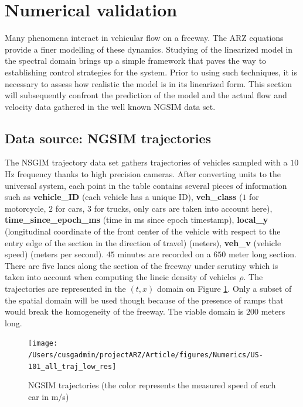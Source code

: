 \documentclass[preprint]{elsarticle}
\begin{document}
\section{Numerical validation}

Many phenomena interact in vehicular flow on a freeway. The ARZ equations
provide a finer modelling of these dynamics. Studying of the linearized
model in the spectral domain brings up a simple framework that paves
the way to establishing control strategies for the system. Prior to
using such techniques, it is necessary to assess how realistic the
model is in its linearized form. This section will subsequently confront the prediction of the model and the actual flow
and velocity data gathered in the well known NGSIM data set.


\subsection{Data source: NGSIM trajectories}

The NSGIM trajectory data set gathers trajectories of vehicles sampled
with a $10$ Hz frequency thanks to high precision cameras. After
converting units to the universal system, each point in the table
contains several pieces of information such as \textbf{vehicle\_ID}
(each vehicle has a unique ID), \textbf{veh\_class }($1$ for motorcycle,
$2$ for cars, $3$ for trucks, only cars are taken into account here),
\textbf{time\_since\_epoch\_ms} (time in ms since epoch timestamp),
\textbf{local\_y} (longitudinal coordinate of the front center of
the vehicle with respect to the entry edge of the section in the direction
of travel) (meters), \textbf{veh\_v} (vehicle speed) (meters per second).
$45$ minutes are recorded on a $650$ meter long section. There are
five lanes along the section of the freeway under scrutiny which is
taken into account when computing the lineic density of vehicles $\rho$\@.
The trajectories are represented in the $\left(t,x\right)$ domain
on Figure \ref{fig:NGSIM-trajectories}.
Only a subset of the spatial domain will be used though because of the presence of ramps that would break the homogeneity of the freeway. The viable domain is $200$ meters long.

\begin{figure}
\begin{centering}
\texttt{[image: /Users/cusgadmin/projectARZ/Article/figures/Numerics/US-101\_all\_traj\_low\_res]}
\par\end{centering}

\protect\caption{NGSIM trajectories (the color represents the measured speed of each
car in m/s)\label{fig:NGSIM-trajectories}}
\end{figure}
\end{document}
